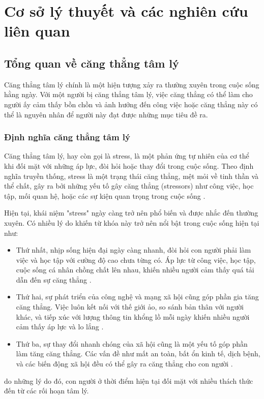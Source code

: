 \chapter{Cơ sở lý thuyết và các nghiên cứu liên quan}
\section{Tổng quan về căng thẳng tâm lý}
Căng thẳng tâm lý chính là một hiện tượng xảy ra thường xuyên trong cuộc sống hằng ngày. Với một người bị căng thẳng tâm lý, việc căng thẳng có thể làm cho người ấy cảm thấy bồn chồn và ảnh hưởng đến công việc hoặc căng thẳng này có thể là nguyên nhân để người này đạt được những mục tiêu đề ra. 

\subsection{Định nghĩa căng thẳng tâm lý}
Căng thẳng tâm lý, hay còn gọi là stress, là một phản ứng tự nhiên của cơ thể khi đối mặt với những áp lực, đòi hỏi hoặc thay đổi trong cuộc sống. Theo định nghĩa truyền thống, stress là một trạng thái căng thẳng, mệt mỏi về tinh thần và thể chất, gây ra bởi những yếu tố gây căng thẳng (stressors) như công việc, học tập, mối quan hệ, hoặc các sự kiện quan trọng trong cuộc sống \cite{stress_def}.

Hiện tại, khái niệm "stress" ngày càng trở nên phổ biến và được nhắc đến thường xuyên. Có nhiều lý do khiến từ khóa này trở nên nổi bật trong cuộc sống hiện tại như:
\begin{itemize}
    \item Thứ nhất, nhịp sống hiện đại ngày càng nhanh, đòi hỏi con người phải làm việc và học tập với cường độ cao chưa từng có. Áp lực từ công việc, học tập, cuộc sống cá nhân chồng chất lên nhau, khiến nhiều người cảm thấy quá tải dẫn đến sự căng thẳng \cite{Herbert}.
    \item Thứ hai, sự phát triển của công nghệ và mạng xã hội cũng góp phần gia tăng căng thẳng. Việc luôn kết nối với thế giới ảo, so sánh bản thân với người khác, và tiếp xúc với lượng thông tin khổng lồ mỗi ngày khiến nhiều người cảm thấy áp lực và lo lắng \cite{Lazarus}.
    \item Thứ ba, sự thay đổi nhanh chóng của xã hội cũng là một yếu tố góp phần làm tăng căng thẳng. Các vấn đề như mất an toàn, bất ổn kinh tế, dịch bệnh, và các biến động xã hội đều có thể gây ra căng thẳng cho con người \cite{student_life3, student_life4}.
\end{itemize} 
do những lý do đó, con người ở thời điểm hiện tại đối mặt với nhiều thách thức đến từ các rối hoạn tâm lý.

